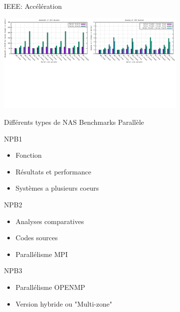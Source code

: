 \documentclass{beamer}
\begin{document}
\begin{frame}{IEEE: Accélération}

  \centering\includegraphics[width=350px]{../ressources/vm_ieee.png}
  
\end{frame}

\begin{frame}{Différents types de NAS Benchmarks Parallèle}

  \begin{block}{NPB1}
    \begin{itemize}
    \item Fonction
    \item Résultats et performance
    \item Systèmes a plusieurs coeurs
    \end{itemize}
  \end{block}
  
  \begin{block}{NPB2}
    \begin{itemize}
    \item Analyses comparatives
    \item Codes sources
    \item Parallélisme  MPI
    \end{itemize}
  \end{block}
  
  \begin{block}{NPB3}
    \begin{itemize}
    \item Parallélisme OPENMP
    \item Version hybride ou "Multi-zone" 
    \end{itemize}
  \end{block}

\end{frame}
\end{document}

